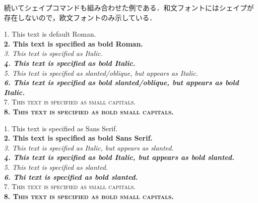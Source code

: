 続いてシェイプコマンドも組み合わせた例である．和文フォントにはシェイプが存在しないので，欧文フォントのみ示している．
\begin{tcolorbox}[title=\gtbf{Stix Twoフォントのシェイプ},colback=yellow!15!white,colframe=blue!75!black,enhanced,breakable=true]
\textrm{1. This text is default Roman.}\\
\textbf{2. This text is specified as bold Roman.}\\
\textit{3. This text is specified as Italic.}\\
\textit{\textbf{4. This text is specified as bold Italic.}}\\
\textsl{5. This text is specified as slanted/oblique, but appears as {\color{red}Italic}.}\\
\textsl{\textbf{6. This text is specified as bold slanted/oblique, but appears as bold {\color{red}Italic}.}}\\
\textsc{7. This text is specified as small capitals.}\\
\textsc{\textbf{8. This text is specified as bold small capitals.}}
\end{tcolorbox}

\begin{tcolorbox}[title=\gtbf{Robotoフォントのシェイプ},colback=yellow!15!white,colframe=blue!75!black,enhanced,breakable=true]
\textsf{1. This text is specified as Sans Serif.}\\
\textsf{\textbf{2. This text is specified as bold Sans Serif.}}\\
\textsf{\textit{3. This text is specified as Italic, but appears as {\color{red}slanted}.}}\\
\textsf{\textit{\textbf{4. This text is specified as bold Italic, but appears as bold {\color{red}slanted}.}}}\\
\textsf{\textsl{5. This text is specified as slanted.}}\\
\textsf{\textsl{\textbf{6. Thi text is specified as bold slanted.}}}\\
\textsf{\textsc{7. This text is specified as small capitals.}}\\
\textsf{\textsc{\textbf{8. This text is specified as bold small capitals.}}}
\end{tcolorbox}


